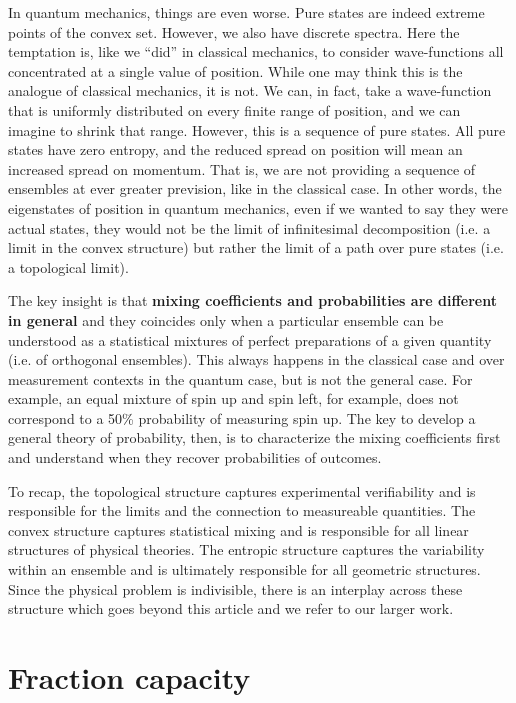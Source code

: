 \documentclass[10pt,twocolumn, nofootinbib]{revtex4-2}
\begin{document}
In quantum mechanics, things are even worse. Pure states are indeed extreme points of the convex set. However, we also have discrete spectra. Here the temptation is, like we ``did'' in classical mechanics, to consider wave-functions all concentrated at a single value of position. While one may think this is the analogue of classical mechanics, it is not. We can, in fact, take a wave-function that is uniformly distributed on every finite range of position, and we can imagine to shrink that range. However, this is a sequence of pure states. All pure states have zero entropy, and the reduced spread on position will mean an increased spread on momentum. That is, we are not providing a sequence of ensembles at ever greater prevision, like in the classical case. In other words, the eigenstates of position in quantum mechanics, even if we wanted to say they were actual states, they would not be the limit of infinitesimal decomposition (i.e. a limit in the convex structure) but rather the limit of a path over pure states (i.e. a topological limit).

The key insight is that \textbf{mixing coefficients and probabilities are different in general} and they coincides only when a particular ensemble can be understood as a statistical mixtures of perfect preparations of a given quantity (i.e. of orthogonal ensembles). This always happens in the classical case and over measurement contexts in the quantum case, but is not the general case. For example, an equal mixture of spin up and spin left, for example, does not correspond to a 50\% probability of measuring spin up. The key to develop a general theory of probability, then, is to characterize the mixing coefficients first and understand when they recover probabilities of outcomes.

To recap, the topological structure captures experimental verifiability and is responsible for the limits and the connection to measureable quantities. The convex structure captures statistical mixing and is responsible for all linear structures of physical theories. The entropic structure captures the variability within an ensemble and is ultimately responsible for all geometric structures. Since the physical problem is indivisible, there is an interplay across these structure which goes beyond this article and we refer to our larger work.

\section{Fraction capacity}
\end{document}

